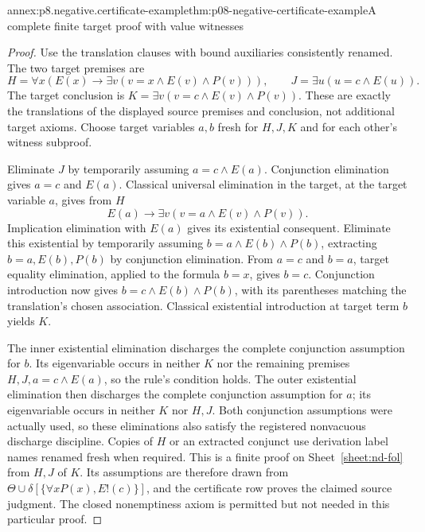 \begin{annexitem}{annex:p8.negative.certificate-example}{thm:p08-negative-certificate-example}{A complete finite target proof with value witnesses}
\begin{proof}
Use the translation clauses with bound auxiliaries consistently renamed.
The two target premises are
\[
 H=\forall x\left(E(x)\to
      \exists v(v=x\land E(v)\land P(v))\right),\qquad
 J=\exists u(u=c\land E(u)).
\]
The target conclusion is
\(K=\exists v(v=c\land E(v)\land P(v))\).
These are exactly the translations of the displayed source premises and
conclusion, not additional target axioms. Choose target variables \(a,b\)
fresh for \(H,J,K\) and for each other's witness subproof.

Eliminate \(J\) by temporarily assuming
\(a=c\land E(a)\). Conjunction elimination gives \(a=c\) and
\(E(a)\). Classical universal elimination in the target, at the target
variable \(a\), gives from \(H\)
\[
 E(a)\to\exists v(v=a\land E(v)\land P(v)).
\]
Implication elimination with \(E(a)\) gives its existential consequent.
Eliminate this existential by temporarily assuming
\(b=a\land E(b)\land P(b)\), extracting \(b=a,E(b),P(b)\) by
conjunction elimination. From \(a=c\) and \(b=a\), target equality
elimination, applied to the formula \(b=x\), gives \(b=c\).
Conjunction introduction now gives \(b=c\land E(b)\land P(b)\),
with its parentheses matching the translation's chosen association.
Classical existential introduction at target term \(b\) yields \(K\).

The inner existential elimination discharges the complete conjunction
assumption for \(b\). Its eigenvariable occurs in neither \(K\) nor
the remaining premises \(H,J,a=c\land E(a)\), so the rule's condition
holds. The outer existential elimination then discharges the complete
conjunction assumption for \(a\); its eigenvariable occurs in neither
\(K\) nor \(H,J\). Both conjunction assumptions were actually used,
so these eliminations also satisfy the registered nonvacuous discharge
discipline. Copies of \(H\) or an extracted conjunct use derivation
label names renamed fresh when required. This is a finite proof on
Sheet~\ref{sheet:nd-fol} from \(H,J\) of \(K\). Its assumptions are
therefore drawn from \(\Theta\cup\delta[\{\forall xP(x),E!(c)\}]\),
and the certificate row proves the claimed source judgment. The closed
nonemptiness axiom is permitted but not needed in this particular proof.
\end{proof}
\end{annexitem}
